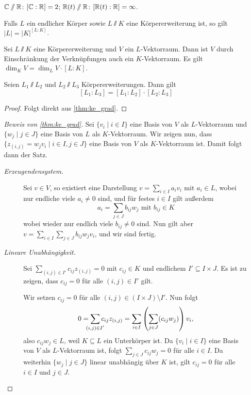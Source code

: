 \documentclass[12pt,a4paper]{scrartcl}
\begin{document}
\begin{bsp}
	$\mathbb C\sslash\mathbb R$: $[\mathbb C:\mathbb R] = 2$; $\mathbb R(t)\sslash \mathbb R$: $[\mathbb R(t): \mathbb R] = \infty$.
\end{bsp}
\begin{bem}
	Falls $L$ ein endlicher Körper sowie $L\sslash K$ eine Körpererweiterung ist, so gilt $|L| = |K|^{ [L:K]}$.
\end{bem}
\begin{satz}\label{thm:ke_grad}
	Sei $L\sslash K$ eine Körpererweiterung und $V$ ein $L$-Vektorraum. Dann ist $V$ durch Einschränkung der Verknüpfungen auch ein $K$-Vektorraum. Es gilt $\dim_KV= \dim_LV\cdot [L:K]$.
\end{satz}
\begin{kor}[Gradformel] \label{kor:gradformel}
	Seien $L_1\sslash L_2$ und $L_2\sslash L_3$ Körpererweiterungen. Dann gilt
	$$ [L_1: L_3] = [L_1:L_2]\cdot [L_2:L_3]$$
\end{kor}
\begin{proof} Folgt direkt aus \cref{thm:ke_grad}.
\end{proof}

\begin{proof}[Beweis von \cref{thm:ke_grad}]
	Sei $\{v_i\mid i\in I\}$ eine Basis von $V$ als $L$-Vektorraum und $\{w_j\mid j\in J\}$ eine Basis von $L$ als $K$-Vektorraum. Wir zeigen nun, dass $\{z_{(i,j)} = w_jv_i\mid i\in I, j\in J\}$ eine Basis von $V$ als $K$-Vektorraum ist. Damit folgt dann der Satz.
	\begin{description}
		\item[\emph{Erzeugendensystem.}] Sei $v\in V$, so existiert eine Darstellung $v = \sum_{i\in I} a_iv_i$ mit $a_i\in L$, wobei nur endliche viele $a_i\neq 0$ sind, und für festes $i\in I$ gilt außerdem
		\[a_i = \sum_{j\in J}b_{ij}w_j \text{ mit } b_{ij}\in K\]
		wobei wieder nur endlich viele $b_{ij}\neq 0$ sind. Nun gilt aber $v = \sum_{i\in I}\sum_{j\in J}b_{ij}w_jv_i$, und wir sind fertig.
		\item[\emph{Lineare Unabhängigkeit.}] Sei $\sum_{(i,j)\in I'}c_{ij}z_{(i,j)} = 0$ mit $c_{ij}\in K$ und endlichem $I'\subseteq I \times J$. Es ist zu zeigen, dass $c_{ij} = 0$ für alle $(i,j)\in I'$ gilt.
		
		Wir setzen $c_{ij} = 0$ für alle $(i,j)\in (I\times J) \setminus I'$. Nun folgt \[0 = \sum_{\mathclap{(i,j)\in I'}}c_{ij}z_{(i,j)} = \sum_{i\in I}\left(\sum_{j\in J}(c_{ij}w_j)\right)v_i,\]also $c_{ij}w_j\in L$, weil $K\subseteq L$ ein Unterkörper ist. Da $\{v_i\mid i\in I\}$ eine Basis von $V$ als $L$-Vektorraum ist, folgt $\sum_{j\in J}c_{ij}w_j = 0$ für alle $i \in I$. Da weiterhin $\{w_j\mid j\in J\}$ linear unabhängig über $K$ ist, gilt $c_{ij} = 0$ für alle $i \in I$ und $j \in J$.
  \qedhere
	\end{description}
\end{proof}
\end{document}
